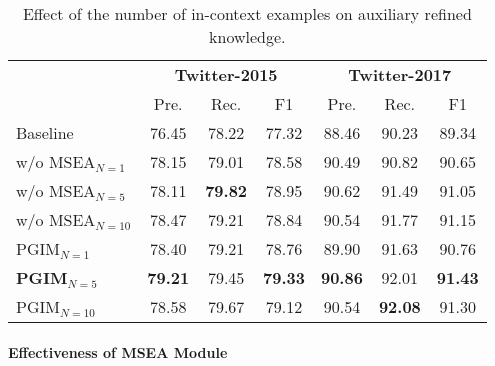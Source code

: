 \documentclass[11pt]{article}
\begin{document}
\begin{table}[t!]
\small
\setlength\tabcolsep{2.6pt}
\renewcommand{\arraystretch}{1.2}
\centering
\begin{tabular}{l|cccccc}
\toprule
& \multicolumn{3}{c|}{\textbf{Twitter-2015}} & \multicolumn{3}{c}{\textbf{Twitter-2017}}\\
& Pre. & Rec. & \multicolumn{1}{c|}{F1}  & Pre. & Rec. & \multicolumn{1}{c}{F1}    \\
\midrule
Baseline      & 76.45  & 78.22 & \multicolumn{1}{c|}{77.32}  & 88.46  & 90.23 & 89.34  \\\midrule
w/o MSEA$_{N=1}$     & 78.15  & 79.01 & \multicolumn{1}{c|}{78.58}  & 90.49  & 90.82 & 90.65  \\
w/o MSEA$_{N=5}$     & 78.11  & \textbf{79.82} & \multicolumn{1}{c|}{78.95}  & 90.62  & 91.49 & 91.05  \\
w/o MSEA$_{N=10}$     & 78.47  & 79.21 & \multicolumn{1}{c|}{78.84}  & 90.54  & 91.77 & 91.15 \\\midrule
PGIM$_{N=1}$     & 78.40 & 79.21 & \multicolumn{1}{c|}{78.76} & 89.90 & 91.63 & 90.76 \\
\textbf{PGIM$_{N=5}$}     & \textbf{79.21} & 79.45 & \multicolumn{1}{c|}{\textbf{79.33}} & \textbf{90.86} & 92.01 & \textbf{91.43} \\
PGIM$_{N=10}$      & 78.58 & 79.67 & \multicolumn{1}{c|}{79.12} & 90.54 & \textbf{92.08} & 91.30 \\
\bottomrule
\end{tabular}
\caption{Effect of the number of in-context examples on auxiliary refined knowledge.}
\label{tab:PGIM ChatGPT4}
\end{table}
\paragraph{Effectiveness of MSEA Module}
\end{document}
